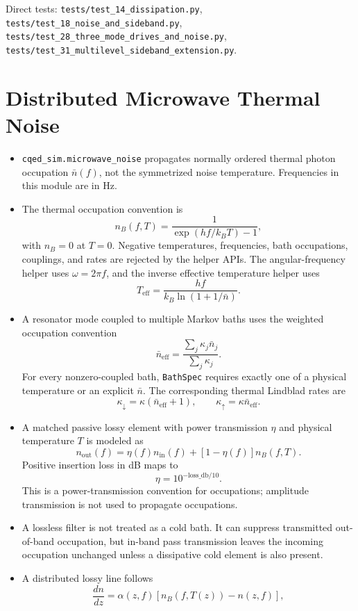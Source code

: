 \documentclass[11pt]{article}
\begin{document}
\noindent
Direct tests:
\texttt{tests/test\_14\_dissipation.py},
\texttt{tests/test\_18\_noise\_and\_sideband.py},
\texttt{tests/test\_28\_three\_mode\_drives\_and\_noise.py},
\texttt{tests/test\_31\_multilevel\_sideband\_extension.py}.

\section{Distributed Microwave Thermal Noise}
\begin{itemize}[leftmargin=1.5em]
  \item \texttt{cqed\_sim.microwave\_noise} propagates normally ordered
  thermal photon occupation \(\bar{n}(f)\), not the symmetrized noise
  temperature. Frequencies in this module are in Hz.
  \item The thermal occupation convention is
  \[
  n_B(f,T)=\frac{1}{\exp(h f/k_B T)-1},
  \]
  with \(n_B=0\) at \(T=0\). Negative temperatures, frequencies, bath
  occupations, couplings, and rates are rejected by the helper APIs. The
  angular-frequency helper uses \(\omega=2\pi f\), and the inverse effective
  temperature helper uses
  \[
  T_{\mathrm{eff}}=
  \frac{h f}{k_B\ln(1+1/\bar{n})}.
  \]
  \item A resonator mode coupled to multiple Markov baths uses the weighted
  occupation convention
  \[
  \bar{n}_{\mathrm{eff}}=
  \frac{\sum_j \kappa_j\bar{n}_j}{\sum_j\kappa_j}.
  \]
  For every nonzero-coupled bath, \texttt{BathSpec} requires exactly one of a
  physical temperature or an explicit \(\bar{n}\). The corresponding thermal
  Lindblad rates are
  \[
  \kappa_\downarrow=\kappa(\bar{n}_{\mathrm{eff}}+1),\qquad
  \kappa_\uparrow=\kappa\bar{n}_{\mathrm{eff}}.
  \]
  \item A matched passive lossy element with power transmission \(\eta\) and
  physical temperature \(T\) is modeled as
  \[
  n_{\mathrm{out}}(f)=\eta(f)n_{\mathrm{in}}(f)
  +\left[1-\eta(f)\right]n_B(f,T).
  \]
  Positive insertion loss in dB maps to
  \[
  \eta = 10^{-\mathrm{loss\_db}/10}.
  \]
  This is a power-transmission convention for occupations; amplitude
  transmission is not used to propagate occupations.
  \item A lossless filter is not treated as a cold bath. It can suppress
  transmitted out-of-band occupation, but in-band pass transmission leaves the
  incoming occupation unchanged unless a dissipative cold element is also
  present.
  \item A distributed lossy line follows
  \[
  \frac{dn}{dz} = \alpha(z,f)\left[n_B(f,T(z))-n(z,f)\right],
\]
\end{itemize}
\end{document}
